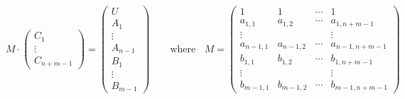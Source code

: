\begin{equation*}
	M \cdot 
		\begin{pmatrix}
			C_1 	\\
			\vdots 	\\
			C_{n+m-1}
		\end{pmatrix}
	=
		\begin{pmatrix}
			U 		\\[-0.5em] 
			A_1 	\\[-0.5em] 
			\vdots 	\\[-0.5em] 
			A_{n-1}	\\[-0.5em] 
			B_1 	\\[-0.5em] 
			\vdots 	\\[-0.5em] 
			B_{m-1}
		\end{pmatrix}
	\;\;\;\;\;\;\text{ where }\;\;
	M = \begin{pmatrix}
			1			& 1			& \cdots 	& 1 					\\[-0.5em]
			a_{1,1}		& a_{1,2}	& \cdots 	& a_{1, n+m-1} 		\\[-0.5em]
			\vdots 		&			&			& \vdots 			\\[-0.5em]
			a_{n-1,1}	& a_{n-1, 2}	& \cdots 	& a_{n-1, n+m-1} 	\\[-0.5em]
			b_{1,1} 		& b_{1,2} 	& \cdots 	& b_{1, n+m-1}		\\[-0.5em]
			\vdots 		& 			&			& \vdots 			\\[-0.5em]
			b_{m-1,1} 	& b_{m-1,2}	& \cdots 	& b_{m-1,n+m-1}
	\end{pmatrix}
\end{equation*}


